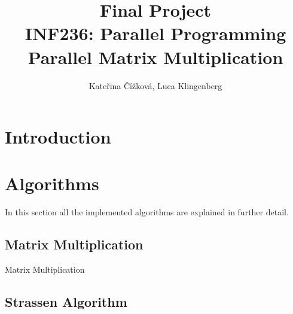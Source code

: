 \documentclass{article}
\title{Final Project\\ INF236: Parallel Programming\\ Parallel Matrix Multiplication}
\author{Kate\v{r}ina \v{C}\'{i}\v{z}kov\'{a}, Luca Klingenberg}
\begin{document}
\maketitle

\section{Introduction}

\section{Algorithms}
In this section all the implemented algorithms are explained in further detail.

\subsection{Matrix Multiplication}

\begin{algorithm}[H] 
\caption{Matrix Multiplication}
\label{alg:matmul}
\begin{algorithmic}[1]
\Statex
{}
		\EndFor
			\EndFor
		\EndFor
	\EndFor
	\State {}
\EndFunction
\end{algorithmic}
\end{algorithm}

\subsection{Strassen Algorithm}
\end{document}
